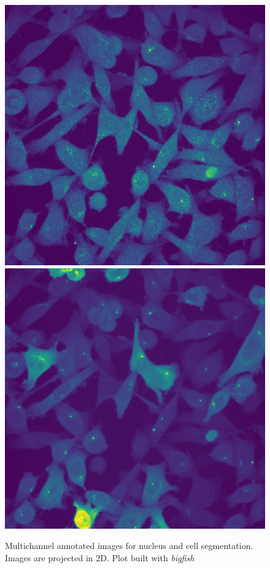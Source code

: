 \begin{figure}[]
	\endminipage\hfill
		\includegraphics[width=0.95\linewidth]{figures/chapter3/smfish_BICD2}
		\vfill
		\includegraphics[width=0.95\linewidth]{figures/chapter3/gfp_BICD2}
	\endminipage
	\caption[Segmentation dataset]{Multichannel annotated images for nucleus and cell segmentation.
	Images are projected in 2D.
	Plot built with \emph{bigfish}}
	\label{fig:annotated_dataset_segmentation}
\end{figure}

